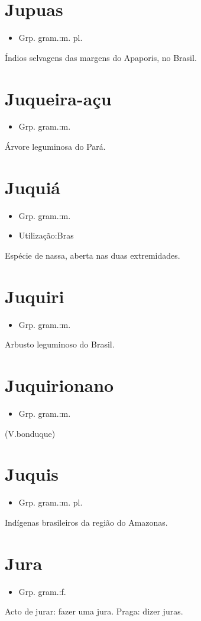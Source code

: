 \documentclass{article}
\begin{document}
\section{Jupuas}
\begin{itemize}
\item {Grp. gram.:m. pl.}
\end{itemize}
Índios selvagens das margens do Apaporis, no Brasil.
\section{Juqueira-açu}
\begin{itemize}
\item {Grp. gram.:m.}
\end{itemize}
Árvore leguminosa do Pará.
\section{Juquiá}
\begin{itemize}
\item {Grp. gram.:m.}
\end{itemize}
\begin{itemize}
\item {Utilização:Bras}
\end{itemize}
Espécie de nassa, aberta nas duas extremidades.
\section{Juquiri}
\begin{itemize}
\item {Grp. gram.:m.}
\end{itemize}
Arbusto leguminoso do Brasil.
\section{Juquirionano}
\begin{itemize}
\item {Grp. gram.:m.}
\end{itemize}
(V.bonduque)
\section{Juquis}
\begin{itemize}
\item {Grp. gram.:m. pl.}
\end{itemize}
Indígenas brasileiros da região do Amazonas.
\section{Jura}
\begin{itemize}
\item {Grp. gram.:f.}
\end{itemize}
Acto de jurar: \textunderscore fazer uma jura\textunderscore .
Praga: \textunderscore dizer juras\textunderscore .
\end{document}
